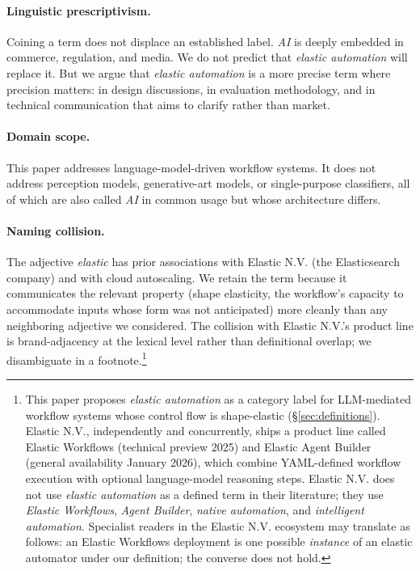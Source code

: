 \documentclass[11pt,a4paper]{article}
\begin{document}
\paragraph{Linguistic prescriptivism.} Coining a term does not displace an established label. \textit{AI} is deeply embedded in commerce, regulation, and media. We do not predict that \textit{elastic automation} will replace it. But we argue that \textit{elastic automation} is a more precise term where precision matters: in design discussions, in evaluation methodology, and in technical communication that aims to clarify rather than market.

\paragraph{Domain scope.} This paper addresses language-model-driven workflow systems. It does not address perception models, generative-art models, or single-purpose classifiers, all of which are also called \textit{AI} in common usage but whose architecture differs.

\paragraph{Naming collision.} The adjective \textit{elastic} has prior associations with Elastic N.V. (the Elasticsearch company) and with cloud autoscaling. We retain the term because it communicates the relevant property (shape elasticity, the workflow's capacity to accommodate inputs whose form was not anticipated) more cleanly than any neighboring adjective we considered. The collision with Elastic N.V.'s product line is brand-adjacency at the lexical level rather than definitional overlap; we disambiguate in a footnote.\footnote{This paper proposes \textit{elastic automation} as a category label for LLM-mediated workflow systems whose control flow is shape-elastic (\S\ref{sec:definitions}). Elastic N.V., independently and concurrently, ships a product line called Elastic Workflows (technical preview 2025) and Elastic Agent Builder (general availability January 2026), which combine YAML-defined workflow execution with optional language-model reasoning steps. Elastic N.V. does not use \textit{elastic automation} as a defined term in their literature; they use \textit{Elastic Workflows}, \textit{Agent Builder}, \textit{native automation}, and \textit{intelligent automation}. Specialist readers in the Elastic N.V. ecosystem may translate as follows: an Elastic Workflows deployment is one possible \textit{instance} of an elastic automator under our definition; the converse does not hold.}
\end{document}
